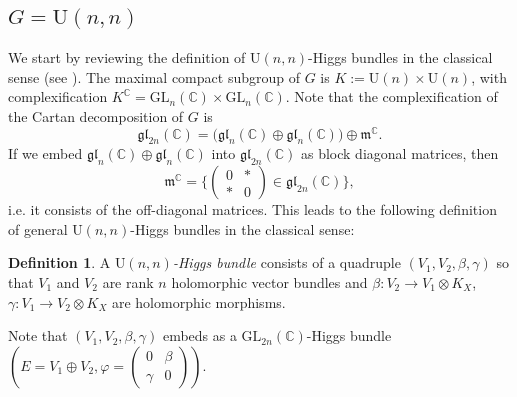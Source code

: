 \documentclass[oneside,11pt]{amsart}
\theoremstyle{definition}
\newtheorem{defn}[thm]{Definition}
\theoremstyle{remark}
\numberwithin{thm}{section}
\numberwithin{equation}{section}
\begin{document}
\subsection{\texorpdfstring{$G=\mathrm{U}(n,n)$}{G=U(n,n)}}
We start by reviewing the definition of $\mathrm{U}(n,n)$-Higgs bundles in the classical sense (see \cite{MaXi}). The maximal compact subgroup of $G$ is $K:=\mathrm{U}(n)\times\mathrm{U}(n)$, with complexification $K^{\mathbb{C}}=\mathrm{GL}_n(\mathbb{C})\times\mathrm{GL}_n(\mathbb{C})$. Note that the complexification of the Cartan decomposition of $G$ is
$$
\mathfrak{gl}_{2n}(\mathbb{C})=\Big(\mathfrak{gl}_{n}(\mathbb{C})\oplus\mathfrak{gl}_{n}(\mathbb{C})\Big)\oplus\mathfrak{m}^{\mathbb{C}}.
$$
If we embed $\mathfrak{gl}_{n}(\mathbb{C})\oplus\mathfrak{gl}_{n}(\mathbb{C})$ into $\mathfrak{gl}_{2n}(\mathbb{C})$ as block diagonal matrices, then 
$$\mathfrak{m}^{\mathbb{C}}=\bigg\{\begin{pmatrix}
    0&*\\
    *&0
\end{pmatrix}\in\mathfrak{gl}_{2n}(\mathbb{C})\bigg\},$$ 
i.e. it consists of the off-diagonal matrices. This leads to the following definition of general $\mathrm{U}(n,n)$-Higgs bundles in the classical sense:

\begin{defn}\label{def:u(n,n)-classical}
    A \emph{$\mathrm{U}(n,n)$-Higgs bundle} consists of a quadruple $(V_1,V_2,\beta,\gamma)$ so that $V_1$ and $V_2$ are rank $n$ holomorphic vector bundles and $\beta: V_2\to V_1\otimes K_X$, $\gamma: V_1\to V_2\otimes K_X$ are holomorphic morphisms.

    \vspace{2mm}

    \noindent Note that $(V_1,V_2,\beta,\gamma)$ embeds as a $\mathrm{GL}_{2n}(\mathbb{C})$-Higgs bundle $(E=V_1\oplus V_2, \varphi=\begin{pmatrix}
    0&\beta\\
    \gamma&0
\end{pmatrix})$.
\end{defn}
\end{document}
